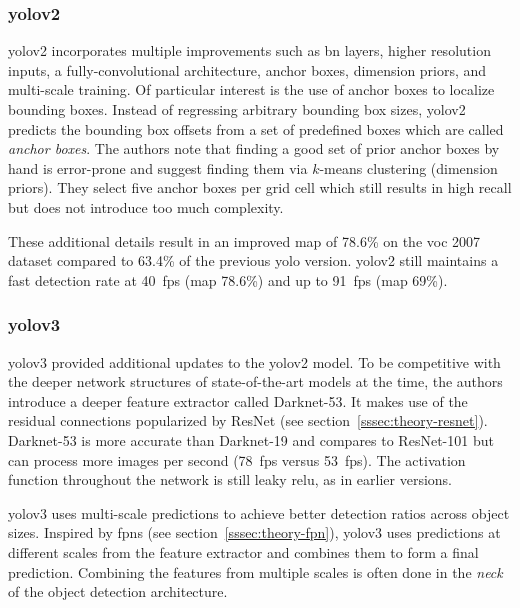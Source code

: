 \documentclass[final]{vutinfth} %
\begin{document}
\subsubsection{\gls{yolo}v2}
\label{sssec:yolov2}

\gls{yolo}v2 \cite{redmon2017} incorporates multiple improvements such
as \gls{bn} layers, higher resolution inputs, a fully-convolutional
architecture, anchor boxes, dimension priors, and multi-scale
training. Of particular interest is the use of anchor boxes to
localize bounding boxes. Instead of regressing arbitrary bounding box
sizes, \gls{yolo}v2 predicts the bounding box offsets from a set of
predefined boxes which are called \emph{anchor boxes}. The authors
note that finding a good set of prior anchor boxes by hand is
error-prone and suggest finding them via $k$-means clustering
(dimension priors). They select five anchor boxes per grid cell which
still results in high recall but does not introduce too much
complexity.

These additional details result in an improved \gls{map} of 78.6\% on
the \gls{voc} 2007 dataset compared to 63.4\% of the previous
\gls{yolo} version. \gls{yolo}v2 still maintains a fast detection rate
at \qty{40}{fps} (\gls{map} 78.6\%) and up to \qty{91}{fps} (\gls{map}
69\%).

\subsubsection{\gls{yolo}v3}
\label{sssec:yolov3}

\gls{yolo}v3 \cite{redmon2018} provided additional updates to the
\gls{yolo}v2 model. To be competitive with the deeper network
structures of state-of-the-art models at the time, the authors
introduce a deeper feature extractor called Darknet-53. It makes use
of the residual connections popularized by ResNet \cite{he2016} (see
section~\ref{sssec:theory-resnet}). Darknet-53 is more accurate than
Darknet-19 and compares to ResNet-101 but can process more images per
second (\qty{78}{fps} versus \qty{53}{fps}). The activation function
throughout the network is still leaky \gls{relu}, as in earlier
versions.

\gls{yolo}v3 uses multi-scale predictions to achieve better detection
ratios across object sizes. Inspired by \glspl{fpn} (see
section~\ref{sssec:theory-fpn}), \gls{yolo}v3 uses predictions at
different scales from the feature extractor and combines them to form
a final prediction. Combining the features from multiple scales is
often done in the \emph{neck} of the object detection architecture.
\end{document}
